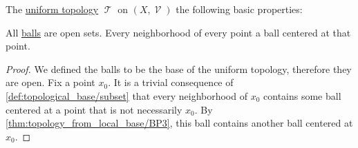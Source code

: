 \begin{proposition}\label{thm:def:uniform_topology}
  The \hyperref[def:uniform_topology]{uniform topology} \( \mscrT \) on \( (X, \mscrV) \) the following basic properties:
  \begin{thmenum}
     All \hyperref[def:entourage/ball]{balls} are open sets.
     Every neighborhood of every point a ball centered at that point.
  \end{thmenum}
\end{proposition}
\begin{proof}
   We defined the balls to be the base of the uniform topology, therefore they are open.
   Fix a point \( x_0 \). It is a trivial consequence of \cref{def:topological_base/subset} that every neighborhood of \( x_0 \) contains some ball centered at a point that is not necessarily \( x_0 \). By \ref{thm:topology_from_local_base/BP3}, this ball contains another ball centered at \( x_0 \).
\end{proof}

